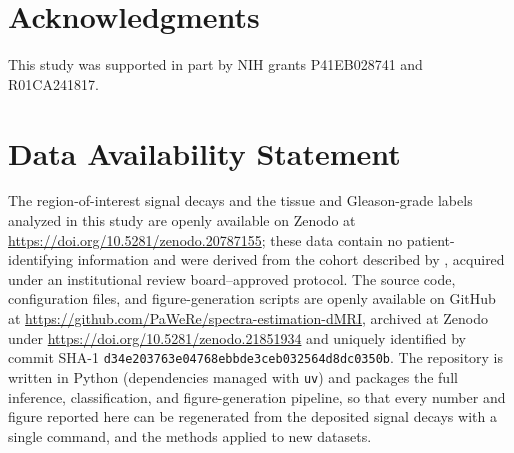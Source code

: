 \documentclass[11pt]{article}
\begin{document}







\section{Acknowledgments}
This study was supported in part by NIH grants P41EB028741 and R01CA241817.

\section{Data Availability Statement}
The region-of-interest signal decays and the tissue and Gleason-grade labels analyzed in this study are openly available on Zenodo at \url{https://doi.org/10.5281/zenodo.20787155}; these data contain no patient-identifying information and were derived from the cohort described by \citet{langkilde2018evaluation}, acquired under an institutional review board--approved protocol. The source code, configuration files, and figure-generation scripts are openly available on GitHub at \url{https://github.com/PaWeRe/spectra-estimation-dMRI}, archived at Zenodo under \url{https://doi.org/10.5281/zenodo.21851934} and uniquely identified by commit SHA-1 \texttt{d34e203763e04768ebbde3ceb032564d8dc0350b}. The repository is written in Python (dependencies managed with \texttt{uv}) and packages the full inference, classification, and figure-generation pipeline, so that every number and figure reported here can be regenerated from the deposited signal decays with a single command, and the methods applied to new datasets.



\pagebreak



\clearpage


\clearpage


\clearpage
\renewcommand{\thefigure}{S\arabic{figure}}
\setcounter{figure}{0}

\end{document}
